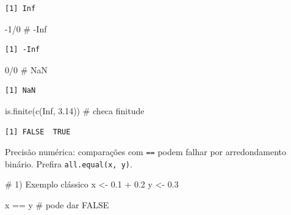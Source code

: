 \documentclass[
  letterpaper,
  DIV=11,
  numbers=noendperiod]{scrreprt}
\newenvironment{Shaded}{\begin{snugshade}}{\end{snugshade}}
\newcommand{\CommentTok}[1]{\textcolor[rgb]{0.37,0.37,0.37}{#1}}
\newcommand{\ConstantTok}[1]{\textcolor[rgb]{0.56,0.35,0.01}{#1}}
\newcommand{\DecValTok}[1]{\textcolor[rgb]{0.68,0.00,0.00}{#1}}
\newcommand{\FloatTok}[1]{\textcolor[rgb]{0.68,0.00,0.00}{#1}}
\newcommand{\FunctionTok}[1]{\textcolor[rgb]{0.28,0.35,0.67}{#1}}
\newcommand{\NormalTok}[1]{\textcolor[rgb]{0.00,0.23,0.31}{#1}}
\newcommand{\OtherTok}[1]{\textcolor[rgb]{0.00,0.23,0.31}{#1}}
\newcommand{\SpecialCharTok}[1]{\textcolor[rgb]{0.37,0.37,0.37}{#1}}
\begin{document}
\begin{verbatim}
[1] Inf
\end{verbatim}

\begin{Shaded}
\begin{Highlighting}[]
\SpecialCharTok{{-}}\DecValTok{1}\SpecialCharTok{/}\DecValTok{0} \CommentTok{\# {-}Inf}
\end{Highlighting}
\end{Shaded}

\begin{verbatim}
[1] -Inf
\end{verbatim}

\begin{Shaded}
\begin{Highlighting}[]
\DecValTok{0}\SpecialCharTok{/}\DecValTok{0}  \CommentTok{\# NaN}
\end{Highlighting}
\end{Shaded}

\begin{verbatim}
[1] NaN
\end{verbatim}

\begin{Shaded}
\begin{Highlighting}[]
\FunctionTok{is.finite}\NormalTok{(}\FunctionTok{c}\NormalTok{(}\ConstantTok{Inf}\NormalTok{, }\FloatTok{3.14}\NormalTok{)) }\CommentTok{\# checa finitude}
\end{Highlighting}
\end{Shaded}

\begin{verbatim}
[1] FALSE  TRUE
\end{verbatim}

\begin{tcolorbox}[enhanced jigsaw, left=2mm, toprule=.15mm, opacityback=0, title=\textcolor{quarto-callout-tip-color}{\faLightbulb}\hspace{0.5em}{Dica}, leftrule=.75mm, breakable, colbacktitle=quarto-callout-tip-color!10!white, coltitle=black, rightrule=.15mm, bottomtitle=1mm, toptitle=1mm, colframe=quarto-callout-tip-color-frame, colback=white, opacitybacktitle=0.6, bottomrule=.15mm, arc=.35mm, titlerule=0mm]

Precisão numérica: comparações com \texttt{==} podem falhar por
arredondamento binário. Prefira \texttt{all.equal(x,\ y)}.

\end{tcolorbox}

\begin{Shaded}
\begin{Highlighting}[]
\CommentTok{\# 1) Exemplo clássico}
\NormalTok{x }\OtherTok{\textless{}{-}} \FloatTok{0.1} \SpecialCharTok{+} \FloatTok{0.2}
\NormalTok{y }\OtherTok{\textless{}{-}} \FloatTok{0.3}

\NormalTok{x }\SpecialCharTok{==}\NormalTok{ y                       }\CommentTok{\# pode dar FALSE}
\end{Highlighting}
\end{Shaded}
\end{document}
